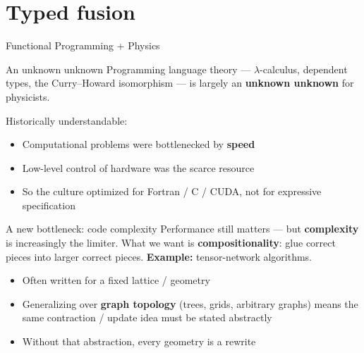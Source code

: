 \section{Typed fusion}
\renewcommand{\currentEdge}{fp-physics}

\begin{frame}{Functional Programming + Physics}
  \begin{center}
  \end{center}
\end{frame}

\begin{frame}{An unknown unknown}
  Programming language theory --- $\lambda$-calculus, dependent types,
  the Curry--Howard isomorphism --- is largely an
  \textbf{unknown unknown} for physicists.

  \vspace{0.8em}
  Historically understandable:
  \begin{itemize}\setlength\itemsep{0.4em}
    \item Computational problems were bottlenecked by \textbf{speed}
    \item Low-level control of hardware was the scarce resource
    \item So the culture optimized for Fortran / C / CUDA, not for
      expressive specification
  \end{itemize}
\end{frame}

\begin{frame}{A new bottleneck: code complexity}
  Performance still matters --- but \textbf{complexity} is increasingly
  the limiter.
  \vspace{0.6em}
  What we want is \textbf{compositionality}: glue correct pieces into
  larger correct pieces.
  \vspace{0.7em}
  \textbf{Example:} tensor-network algorithms.
  \begin{itemize}\setlength\itemsep{0.35em}
    \item Often written for a fixed lattice / geometry
    \item Generalizing over \textbf{graph topology} (trees, grids,
      arbitrary graphs) means the same contraction / update idea
      must be stated abstractly
    \item Without that abstraction, every geometry is a rewrite
  \end{itemize}
\end{frame}

